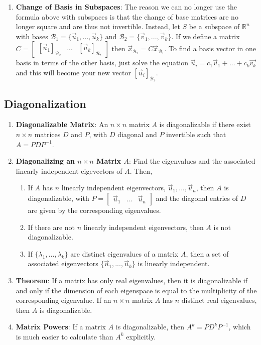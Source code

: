 \documentclass[10pt]{article}
\begin{document}
\begin{enumerate}
\item \textbf{Change of Basis in Subspaces}: The reason we can no longer use the formula above with subspaces is that the change of base matrices are no longer square and are thus not invertible. Instead, let $S$ be a subspace of $\mathbb{R}^n$ with bases $\mathcal{B}_1 = \lbrace \vec{u}_1,...,\vec{u}_k \rbrace$ and $\mathcal{B}_2 = \lbrace \vec{v}_1,...,\vec{v}_k \rbrace$. If we define a matrix $C = \begin{bmatrix}
[\vec{u}_1]_{\mathcal{B}_2} & ... & [\vec{u}_k]_{\mathcal{B}_2}
\end{bmatrix}$ then $\vec{x}_{\mathcal{B}_2} = C\vec{x}_{\mathcal{B}_1}$. To find a basis vector in one basis in terms of the other basis, just solve the equation $\vec{u}_i = c_1\vec{v}_1 + ... + c_k\vec{v_k}$ and this will become your new vector $[\vec{u}_i]_{\mathcal{B}_2}$.
\end{enumerate}
\subsection{Diagonalization}
\begin{enumerate}
\item \textbf{Diagonalizable Matrix}: An $n \times n$ matrix $A$ is diagonalizable if there exist $n \times n$ matrices $D$ and $P$, with $D$ diagonal and $P$ invertible such that $A = PDP^{-1}$.
\item \textbf{Diagonalizing an $n \times n$ Matrix $A$}: Find the eigenvalues and the associated linearly independent eigevectors of $A$. Then, 
\begin{enumerate}
\item If $A$ has $n$ linearly independent eigenvectors, $\vec{u}_1, ..., \vec{u}_n$, then $A$ is diagonalizable, with $P = \begin{bmatrix}
\vec{u}_1 & ... & \vec{u}_n
\end{bmatrix}$ and the diagonal entries of $D$ are given by the corresponding eigenvalues.
\item If there are not $n$ linearly independent eigenvectors, then $A$ is not diagonalizable.
\item If $\lbrace \lambda_1,...,\lambda_k \rbrace$ are distinct eigenvalues of a matrix $A$, then a set of associated eigenvectors $\lbrace \vec{u}_1,...,\vec{u}_k \rbrace$ is linearly independent.
\end{enumerate}
\item \textbf{Theorem}: If a matrix has only real eigenvalues, then it is diagonalizable if and only if the dimension of each eigenspace is equal to the multiplicity of the corresponding eigenvalue. If an $n \times n$ matrix $A$ has $n$ distinct real eigenvalues, then $A$ is diagonalizable.
\item \textbf{Matrix Powers}: If a matrix $A$ is diagonalizable, then $A^k = PD^kP^{-1}$, which is much easier to calculate than $A^k$ explicitly.
\end{enumerate}
\end{document}
